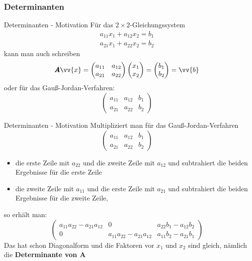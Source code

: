\subsubsection{Determinanten}

\begin{frame}{Determinanten - Motivation}
	Für das $2\times 2$-Gleichungssystem
	\begin{align*}
		a_{11} x_{1} + a_{12} x_{2} = b_{1} \\
		a_{21} x_{1} + a_{22} x_{2} = b_{2}
	\end{align*}
	kann man auch schreiben
	\[
	\pmb{A} \vv{x} =
	\begin{pmatrix}
		a_{11} & a_{12} \\
		a_{21} & a_{22}
	\end{pmatrix} \begin{pmatrix}
	x_{1} \\ x_{2}
	\end{pmatrix} = \begin{pmatrix}
		b_{1} \\ b_{2}
	\end{pmatrix} = \vv{b}
	\]
	oder für das Gauß-Jordan-Verfahren:
	\[
		\left(\begin{array}{cc|c}
			a_{11} & a_{12} & b_{1} \\
			a_{21} & a_{22} & b_{2}
		\end{array}\right)
	\]
\end{frame}

\begin{frame}{Determinanten - Motivation}
	Multipliziert man für das Gauß-Jordan-Verfahren
	\[
	\left(\begin{array}{cc|c}
	a_{11} & a_{12} & b_{1} \\
	a_{21} & a_{22} & b_{2}
	\end{array}\right)
	\]
	\begin{itemize}
	\item die erste Zeile mit $a_{22}$ und die zweite Zeile mit $a_{12}$ und subtrahiert die beiden Ergebnisse für die erste Zeile
	\item die zweite Zeile mit $a_{11}$ und die erste Zeile mit $a_{21}$ und subtrahiert die beiden Ergebnisse für die zweite Zeile,
	\end{itemize}
	so erhält man:
	\[
	\left(\begin{array}{cc|c}
	a_{11}a_{22} - a_{21}a_{12} & 0  & a_{22}b_{1} - a_{12}b_{2} \\
	0 & a_{11}a_{22} - a_{21}a_{12} & a_{11}b_{2} - a_{21}b_{1}
	\end{array}\right)
	\]
	Das hat schon Diagonalform und die Faktoren vor $x_{1}$ und $x_{2}$ sind gleich, nämlich die \textbf{Determinante von $\pmb{A}$}
	
\end{frame}

